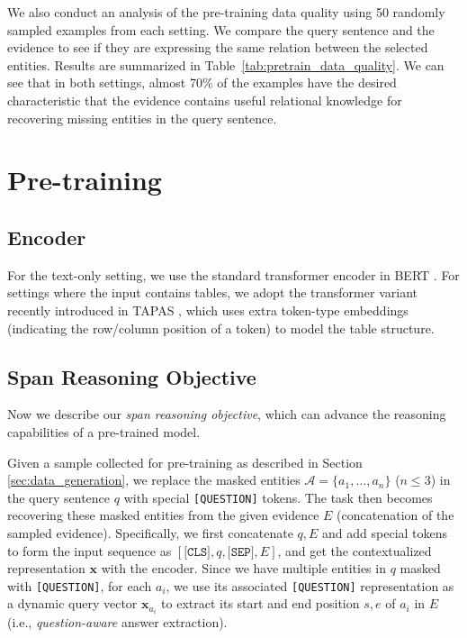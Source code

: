 \documentclass[11pt]{article}
\newcommand{\revise}[1]{#1}
\newcommand{\nop}[1]{}
\begin{document}
\revise{We also conduct an analysis of the pre-training data quality using 50 randomly sampled examples from each setting. We compare the query sentence and the evidence to see if they are expressing the same relation between the selected entities. Results are summarized in Table~\ref{tab:pretrain_data_quality}. We can see that in both settings, almost 70\% of the examples have the desired characteristic\nop{feature} that the evidence contains useful relational knowledge for recovering missing entities in the query sentence.}
 \section{Pre-training}
\subsection{Encoder}
\nop{In this work,  textual and tabular evidence is considered. }For the text-only setting, we use the standard transformer encoder in BERT \cite{devlin-etal-2019-bert}. For settings where the input contains tables, we adopt the transformer variant recently introduced in TAPAS \cite{herzig-etal-2020-tapas}, which uses extra token-type embeddings \nop{like row and column embeddings}{(indicating the row/column position of a token)} to model the table structure. 

\subsection{{Span Reasoning Objective}} 
{Now we describe our \textit{span reasoning objective}, which can advance the reasoning capabilities of a pre-trained model.}

Given a sample collected for pre-training as described in Section \ref{sec:data_generation}, we replace the masked entities $\mathcal{A}=\{a_1,\dots,a_n\}$ {($n$$\leq$$3$)} in the query sentence $q$ with special \texttt{[QUESTION]} tokens. The task then becomes recovering these masked entities from the given evidence $E$ (concatenation of the sampled evidence)\nop{did we mention that $E$ is the concatenation of the two evidences?}. Specifically, we first concatenate $q,E$ and add special tokens to form the input sequence as $[\texttt{[CLS]},q,\texttt{[SEP]},E]$, \nop{in pre-training, we don't have $\texttt{[QUESTION]}$ after $q$, right? yes}and get the contextualized representation $\mathbf{x}$ with the encoder. Since we have multiple entities in $q$ masked with \texttt{[QUESTION]}, for each $a_i$, we use its associated \texttt{[QUESTION]}  representation as a dynamic query vector $\mathbf{x}_{a_i}$ to extract its start and end position $s, e$ of $a_i$ in $E$ (i.e., \textit{question-aware} answer extraction). \nop{check the equations.}
\end{document}
